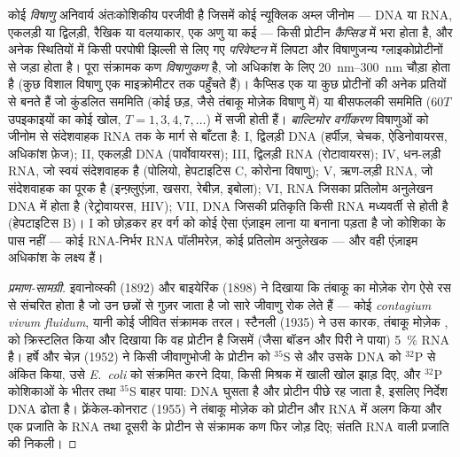 \begin{definition}[विषाणु]\label{def:b3:virology:virus}
कोई \emph{विषाणु} अनिवार्य अंतःकोशिकीय परजीवी है जिसमें कोई
न्यूक्लिक अम्ल जीनोम --- DNA या RNA, एकलड़ी या द्विलड़ी, रैखिक या
वलयाकार, एक अणु या कई --- किसी प्रोटीन \emph{कैप्सिड} में भरा होता है,
और अनेक स्थितियों में किसी परपोषी झिल्ली से लिए गए \emph{परिवेष्टन} में
लिपटा और विषाणुजन्य ग्लाइकोप्रोटीनों से जड़ा होता है। पूरा संक्रामक कण
\emph{विषाणुकण} है, जो अधिकांश के लिए \qtyrange{20}{300}{nm} चौड़ा होता
है (कुछ विशाल विषाणु एक माइक्रोमीटर तक पहुँचते हैं)। कैप्सिड एक या कुछ
प्रोटीनों की अनेक प्रतियों से बनते हैं जो कुंडलित सममिति (कोई छड़, जैसे
तंबाकू मोज़ेक विषाणु में) या बीसफलकी सममिति ($60T$ उपइकाइयों का कोई खोल,
$T = 1, 3, 4, 7,\dots$) में सजी होती हैं। \emph{बाल्टिमोर
वर्गीकरण} विषाणुओं को जीनोम से संदेशवाहक RNA तक के मार्ग से बाँटता है:
I, द्विलड़ी DNA (हर्पीज़, चेचक, ऐडिनोवायरस, अधिकांश फ़ेज); II,
एकलड़ी DNA (पार्वोवायरस); III, द्विलड़ी RNA (रोटावायरस);
IV, धन-लड़ी RNA, जो स्वयं संदेशवाहक है (पोलियो, हेपटाइटिस C, कोरोना
विषाणु); V, ऋण-लड़ी RNA, जो संदेशवाहक का पूरक है
(इन्फ़्लुएंज़ा, खसरा, रेबीज़, इबोला); VI, RNA जिसका प्रतिलोम अनुलेखन DNA
में होता है (रेट्रोवायरस, HIV); VII, DNA जिसकी प्रतिकृति किसी RNA
मध्यवर्ती से होती है (हेपटाइटिस B)। I को छोड़कर हर वर्ग को कोई ऐसा
एंज़ाइम लाना या बनाना पड़ता है जो कोशिका के पास नहीं --- कोई RNA-निर्भर
RNA पॉलीमरेज़, कोई प्रतिलोम अनुलेखक --- और वही एंज़ाइम अधिकांश
 के लक्ष्य हैं।
\end{definition}

\begin{proof}[प्रमाण-सामग्री]
इवानोव्स्की (1892) और बाइयेरिंक (1898) ने दिखाया कि तंबाकू का मोज़ेक रोग
ऐसे रस से संचरित होता है जो उन छन्नों से गुज़र जाता है जो सारे जीवाणु
रोक लेते हैं --- कोई \emph{contagium vivum fluidum}, यानी कोई जीवित
संक्रामक तरल। स्टैनली (1935) ने उस कारक, तंबाकू मोज़ेक , को
क्रिस्टलित किया और दिखाया कि वह प्रोटीन है जिसमें (जैसा बॉडन और पिरी ने
पाया) \qty{5}{\%} RNA है। हर्षे और चेज़ (1952) ने किसी जीवाणुभोजी के
प्रोटीन को $^{35}$S से और उसके DNA को $^{32}$P से अंकित किया, उसे
\emph{E.~coli} को संक्रमित करने दिया, किसी मिश्रक में खाली खोल झाड़
दिए, और $^{32}$P कोशिकाओं के भीतर तथा $^{35}$S बाहर पाया: DNA घुसता है
और प्रोटीन पीछे रह जाता है, इसलिए निर्देश DNA ढोता है। फ़्रेंकेल-कोनराट
(1955) ने तंबाकू मोज़ेक  को प्रोटीन और RNA में अलग किया और एक
प्रजाति के RNA तथा दूसरी के प्रोटीन से संक्रामक कण फिर जोड़ दिए; संतति
RNA वाली प्रजाति की निकली।
\end{proof}

